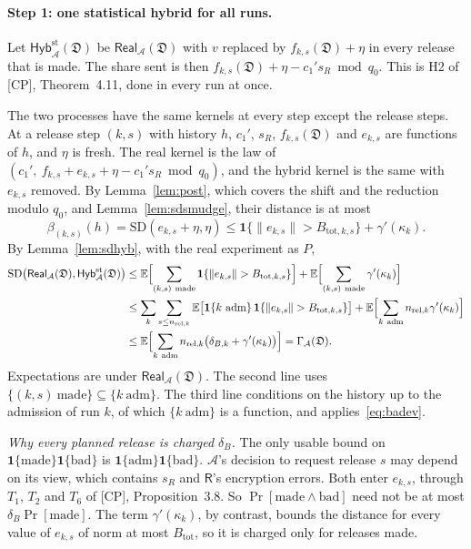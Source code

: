 \documentclass[11pt]{article}
\theoremstyle{definition}
\theoremstyle{plain}
\newcommand{\Rp}{\mathsf{R}}
\newcommand{\Ex}{\mathbb{E}}
\newcommand{\nrm}[1]{\lVert #1\rVert}
\newcommand{\SD}{\mathrm{SD}}
\newcommand{\fs}{f}
\newcommand{\bD}{\mathfrak D}
\newcommand{\Real}{\mathsf{Real}}
\newcommand{\Hyb}{\mathsf{Hyb}}
\newcommand{\adm}{\mathrm{adm}}
\newcommand{\made}{\mathrm{made}}
\newcommand{\CP}{\textup{[CP]}}
\begin{document}
\paragraph{Step 1: one statistical hybrid for all runs.}
Let $\Hyb^{\mathrm{st}}_{\mathcal A}(\bD)$ be $\Real_{\mathcal A}(\bD)$ with $v$ replaced by $\fs_{k,s}(\bD)+\eta$ in every release that is made. The share sent is then $\fs_{k,s}(\bD)+\eta-c_1's_R\bmod q_0$. This is H2 of \CP, Theorem~4.11, done in every run at once.

The two processes have the same kernels at every step except the release steps. At a release step $(k,s)$ with history $h$, $c_1'$, $s_R$, $\fs_{k,s}(\bD)$ and $e_{k,s}$ are functions of $h$, and $\eta$ is fresh. The real kernel is the law of $(c_1',\ \fs_{k,s}+e_{k,s}+\eta-c_1's_R\bmod q_0)$, and the hybrid kernel is the same with $e_{k,s}$ removed. By Lemma~\ref{lem:post}, which covers the shift and the reduction modulo $q_0$, and Lemma~\ref{lem:sdsmudge}, their distance is at most
\[
  \beta_{(k,s)}(h)=\SD(e_{k,s}+\eta,\eta)\le\mathbf 1\{\nrm{e_{k,s}}>B_{\mathrm{tot},k,s}\}+\gamma'(\kappa_k) .
\]
By Lemma~\ref{lem:sdhyb}, with the real experiment as $P$,
\begin{align*}
  \SD\bigl(\Real_{\mathcal A}(\bD),\Hyb^{\mathrm{st}}_{\mathcal A}(\bD)\bigr)
  &\le\Ex\Bigl[\sum_{(k,s)\ \made}\mathbf 1\{\nrm{e_{k,s}}>B_{\mathrm{tot},k,s}\}\Bigr]+\Ex\Bigl[\sum_{(k,s)\ \made}\gamma'(\kappa_k)\Bigr]\\
  &\le\sum_k\sum_{s\le n_{\mathrm{rel},k}}\Ex\bigl[\mathbf 1\{k\ \adm\}\,\mathbf 1\{\nrm{e_{k,s}}>B_{\mathrm{tot},k,s}\}\bigr]+\Ex\Bigl[\sum_{k\ \adm}n_{\mathrm{rel},k}\gamma'(\kappa_k)\Bigr]\\
  &\le\Ex\Bigl[\sum_{k\ \adm}n_{\mathrm{rel},k}\bigl(\delta_{B,k}+\gamma'(\kappa_k)\bigr)\Bigr]=\Gamma_{\mathcal A}(\bD).
\end{align*}
Expectations are under $\Real_{\mathcal A}(\bD)$. The second line uses $\{(k,s)\ \made\}\subseteq\{k\ \adm\}$. The third line conditions on the history up to the admission of run $k$, of which $\{k\ \adm\}$ is a function, and applies~\eqref{eq:badev}.

\emph{Why every planned release is charged $\delta_B$.} The only usable bound on $\mathbf 1\{\made\}\mathbf 1\{\mathrm{bad}\}$ is $\mathbf 1\{\adm\}\mathbf 1\{\mathrm{bad}\}$. $\mathcal A$'s decision to request release $s$ may depend on its view, which contains $s_R$ and $\Rp$'s encryption errors. Both enter $e_{k,s}$, through $T_1$, $T_2$ and $T_6$ of \CP, Proposition~3.8. So $\Pr[\made\wedge\mathrm{bad}]$ need not be at most $\delta_B\Pr[\made]$. The term $\gamma'(\kappa_k)$, by contrast, bounds the distance for every value of $e_{k,s}$ of norm at most $B_{\mathrm{tot}}$, so it is charged only for releases made.
\end{document}
